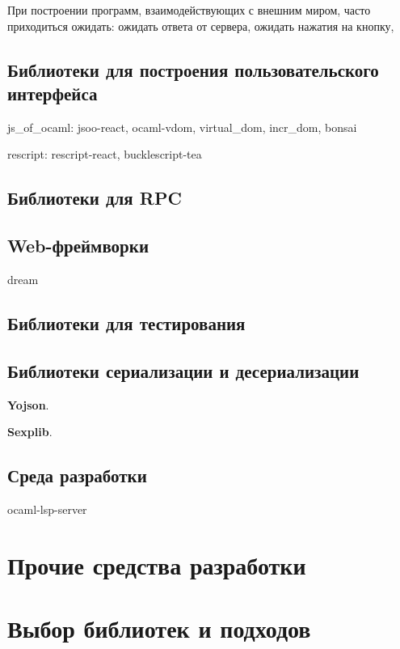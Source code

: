 При построении программ, взаимодействующих с внешним миром,
часто приходиться ожидать:
ожидать ответа от сервера,
ожидать нажатия на кнопку,

\subsection{Библиотеки для построения пользовательского интерфейса}

\TODO

js\_of\_ocaml: jsoo-react, ocaml-vdom, virtual\_dom, incr\_dom, bonsai

rescript: rescript-react, bucklescript-tea

\subsection{Библиотеки для RPC}

\TODO

\subsection{Web-фреймворки}

dream  \TODO

\subsection{Библиотеки для тестирования}

\TODO

\subsection{Библиотеки сериализации и десериализации}

\TODO

\textbf{Yojson}.

\textbf{Sexplib}.

\subsection{Среда разработки}

ocaml-lsp-server

\section{Прочие средства разработки}



\section{Выбор библиотек и подходов}

\TODO
